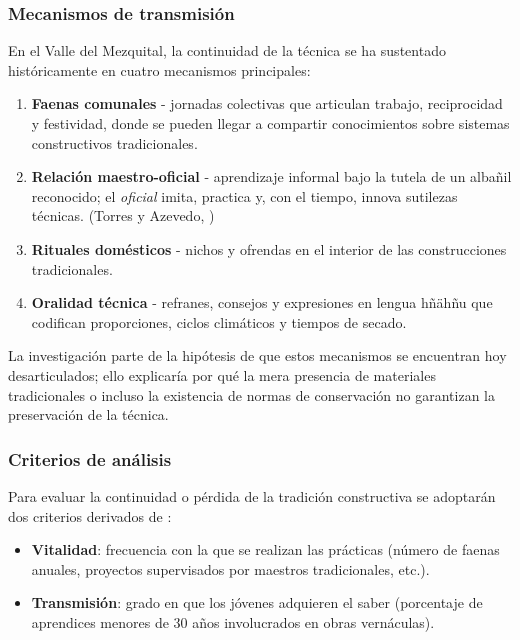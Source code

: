\subsubsection{Mecanismos de transmisión}

En el Valle del Mezquital, la continuidad de la técnica se ha sustentado
históricamente en cuatro mecanismos principales:

\begin{enumerate}
	\item \textbf{Faenas comunales} - jornadas colectivas que
	      articulan trabajo, reciprocidad y festividad, donde se pueden llegar a
	      compartir conocimientos sobre sistemas constructivos tradicionales.
	\item \textbf{Relación maestro-oficial} - aprendizaje informal bajo la
	      tutela de un albañil reconocido; el
	      \emph{oficial} imita, practica y, con el tiempo, innova sutilezas
	      técnicas. (Torres y Azevedo, \citeyear{torres2021transmision})
	\item \textbf{Rituales domésticos} - nichos y ofrendas en el interior
	      de las construcciones tradicionales.
	\item \textbf{Oralidad técnica} - refranes, consejos y
	      expresiones en lengua hñähñu que codifican proporciones, ciclos
	      climáticos y tiempos de secado.
\end{enumerate}

La investigación parte de la hipótesis de que estos mecanismos se
encuentran hoy desarticulados; ello explicaría por qué la mera
presencia de materiales tradicionales o incluso la existencia de normas
de conservación no garantizan la preservación de la técnica.

\subsubsection{Criterios de análisis}

Para evaluar la continuidad o pérdida de la tradición constructiva
se adoptarán dos criterios derivados de \cite{UNESCO2005diversidad}:

\begin{itemize}
	\item \textbf{Vitalidad}: frecuencia con la que se realizan las
	      prácticas (número de faenas anuales, proyectos supervisados por
	      maestros tradicionales, etc.).
	\item \textbf{Transmisión}: grado en que los jóvenes adquieren el
	      saber (porcentaje de aprendices menores de 30 años involucrados
	      en obras vernáculas).
\end{itemize}

